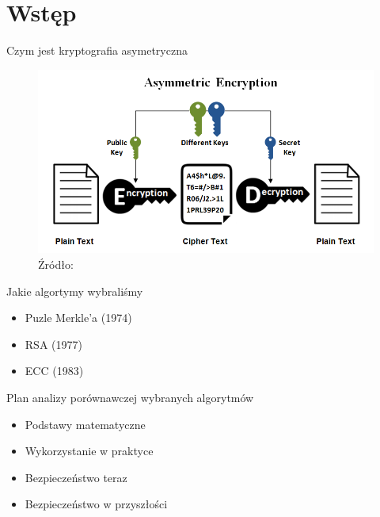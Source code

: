 \section{Wstęp}

\begin{frame}{Czym jest kryptografia asymetryczna}
    \begin{figure}
        \centering
            \includegraphics[height=0.45\textwidth]{introduction/graphics/Asymmetric-Encryption.png}
            \caption{Źródło: \cite{ssl2buy}}
    \end{figure}
\end{frame}

\begin{frame}{Jakie algortymy wybraliśmy}
    \begin{itemize}
        \item Puzle Merkle'a (1974)
        \item RSA (1977)
        \item ECC (1983)
    \end{itemize}

\end{frame}

\begin{frame}{Plan analizy porównawczej wybranych algorytmów}
    \begin{itemize}
        \item Podstawy matematyczne
        \pause
        \item Wykorzystanie w praktyce
        \pause
        \item Bezpieczeństwo teraz
        \pause
        \item Bezpieczeństwo w przyszłości
    \end{itemize}
\end{frame}